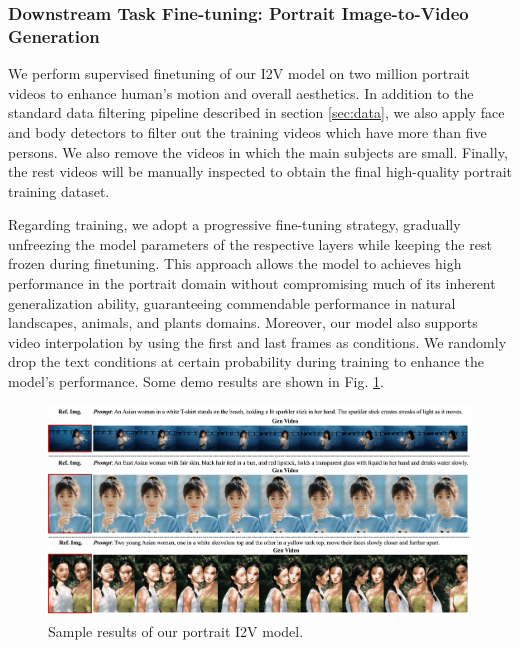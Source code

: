 \subsubsection{Downstream Task Fine-tuning: Portrait Image-to-Video Generation}
We perform supervised finetuning of our I2V model on two million portrait videos to enhance human's motion and overall aesthetics. In addition to the standard data filtering pipeline described in section \ref{sec:data}, we also apply face and body detectors to filter out the training videos which have more than five persons. We also remove the videos in which the main subjects are small. Finally, the rest videos will be manually inspected to obtain the final high-quality portrait training dataset.

Regarding training, we adopt a progressive fine-tuning strategy, gradually unfreezing the model parameters of the respective layers while keeping the rest frozen during finetuning. This approach allows the model to achieves high performance in the portrait domain without compromising much of its inherent generalization ability, guaranteeing commendable performance in natural landscapes, animals, and plants domains. Moreover, our model also supports video interpolation by using the first and last frames as conditions. We randomly drop the text conditions at certain probability during training to enhance the model's performance. Some demo results are shown in Fig. \ref{fig:portrait_i2v}.

\begin{figure}[h]
    \centering
    \includegraphics[width=\linewidth]{applications//app_figures/portrait_to_video_new.png}
    \caption{Sample results of our portrait I2V model.}
    \label{fig:portrait_i2v}
\end{figure}